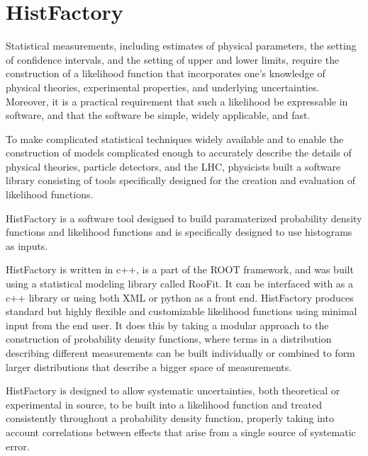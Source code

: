 

\section{HistFactory}

Statistical measurements, including estimates of physical parameters, the setting of confidence intervals, and the setting of upper and lower limits, require the construction of a likelihood function that incorporates one's knowledge of physical theories, experimental properties, and underlying uncertainties.
Moreover, it is a practical requirement that such a likelihood be expressable in software, and that the software be simple, widely applicable, and fast.

To make complicated statistical techniques widely available and to enable the construction of models complicated enough to accurately describe the details of physical theories, particle detectors, and the LHC, physicists built a software library consisting of tools specifically designed for the creation and evaluation of likelihood functions.

HistFactory is a software tool designed to build paramaterized probability density functions and likelihood functions and is specifically designed to use histograms as inputs.

HistFactory is written in c++, is a part of the ROOT framework, and was built using a statistical modeling library called RooFit.
It can be interfaced with as a c++ library or using both XML or python as a front end.
HistFactory produces standard but highly flexible and customizable likelihood functions using minimal input from the end user.
It does this by taking a modular approach to the construction of probability density functions, where terms in a distribution describing different measurements can be built individually or combined to form larger distributions that describe a bigger space of measurements.

HistFactory is designed to allow systematic uncertainties, both theoretical or experimental in source, to be built into a likelihood function and treated consistently throughout a probability density function, properly taking into account correlations between effects that arise from a single source of systematic error.



